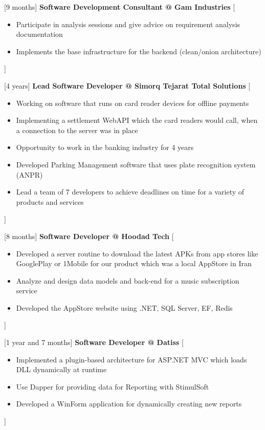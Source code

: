 \documentclass{resume}
\begin{document}
\begin{experiences}
    \separator{0.5ex}
    {[9 months] \textbf{Software Development Consultant @ Gam Industries}}%
    [\begin{itemize}
      \item Participate in analysis sessions and give advice on requirement analysis documentation
      \item Implements the base infrastructure for the backend (clean/onion architecture)
    \end{itemize}]

    \separator{0.5ex}
    {[4 years] \textbf{Lead Software Developer @ Simorq Tejarat Total Solutions} }%
    [\begin{itemize}
      \item Working on software that runs on card reader devices for offline payments
      \item Implementing a settlement WebAPI which the card readers would call, when a connection to the server was in place
      \item Opportunity to work in the banking industry for 4 years
      \item Developed Parking Management software that uses plate recognition system (ANPR)
      \item Lead a team of 7 developers to achieve deadlines on time for a variety of products and services
    \end{itemize}]

    \separator{0.5ex}
    {[8 months] \textbf{Software Developer @ Hoodad Tech} }%
    [\begin{itemize}
      \item Developed a server routine to download the latest APKs from app stores like GooglePlay or 1Mobile for our product which was a local AppStore in Iran
      \item  Analyze and design data models and back-end for a music subscription service
      \item Developed the AppStore website using .NET, SQL Server, EF, Redis
    \end{itemize}]

     \separator{0.5ex}
    {[1 year and  7 months] \textbf{Software Developer @ Datiss} }%
    [\begin{itemize}
      \item Implemented a plugin-based architecture for ASP.NET MVC which loads DLL dynamically at runtime
      \item  Use Dapper for providing data for Reporting with StimulSoft
      \item  Developed a WinForm application for dynamically creating new reports
    \end{itemize}]


\end{experiences}
\end{document}
